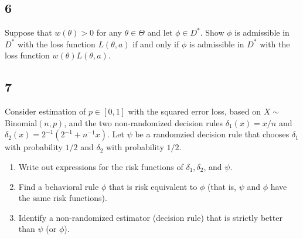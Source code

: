 \documentclass[12pt]{article}
\begin{document}
\subsection*{6}
\begin{tcolorbox}
  Suppose that $w(\theta)>0$ for any $\theta \in \Theta$ and let $\phi \in D^*$.  Show $\phi$ is admissible in $D^*$ with the loss function $L(\theta,a)$
  if and only if $\phi$ is admissible in $D^*$ with the loss function $w(\theta)L(\theta,a)$.
\end{tcolorbox}



\subsection*{7}
\begin{tcolorbox}
  Consider estimation of $p \in [0,1]$ with the squared error loss, based on $X\sim$Binomial$(n,p)$, and the two non-randomized decision rules
  $\delta_1(x)= x/n$ and $\delta_2(x)= 2^{-1}(  2^{-1} + n^{-1}x)$. Let $\psi$ be a randomzied decision rule that chooses $\delta_1$ with probability $1/2$ and $\delta_2$ with probability $1/2$.

  \begin{enumerate}
    \item Write out expressions for the risk functions of $\delta_1,\delta_2$, and $\psi$.
    \item Find a behavioral rule $\phi$ that is risk equivalent to $\phi$ (that is, $\psi$ and $\phi$ have the same risk functions).
    \item Identify a non-randomized estimator (decision rule) that is strictly better than $\psi$ (or $\phi$).
  \end{enumerate}
\end{tcolorbox}
\end{document}
